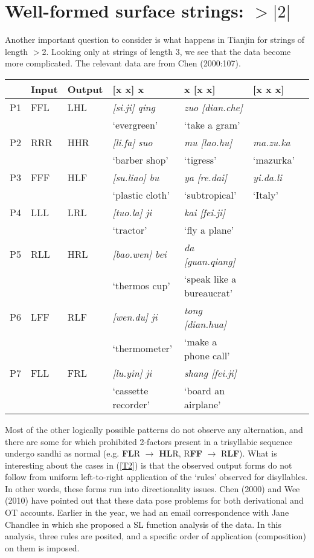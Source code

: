 \documentclass{article}
\begin{document}
\section{Well-formed surface strings: $>|2|$}
Another important question to consider is what happens in Tianjin for strings of length $>$2. Looking only at strings of length 3, we see that the data become more complicated. The relevant data are from Chen (2000:107).
\begin{exe}
\ex \label{T2}
\renewcommand{\arraystretch}{1.2}
\begin{tabular}[t]{lllllll}
& Input & Output & [x x] x & x [x x] & [x x x] \\
\hline 
P1 & FFL & LHL & \textit{[si.ji] qing} & \textit{zuo [dian.che]} & \\
&&& `evergreen' & `take a gram' & \\
P2 & RRR & HHR & \emph{[li.fa] suo} & \emph{mu [lao.hu]} & \emph{ma.zu.ka}\\
&&& `barber shop' & `tigress' & `mazurka' \\
P3 & FFF & HLF & \emph{[su.liao] bu} & \emph{ya [re.dai]} & \emph{yi.da.li}\\
&&& `plastic cloth' & `subtropical' & `Italy' \\
P4 & LLL & LRL & \emph{[tuo.la] ji} & \emph{kai [fei.ji]} & \\
&&& `tractor' & `fly a plane' & \\
P5 & RLL & HRL & \emph{[bao.wen] bei} & \emph{da [guan.qiang]} & \\
&&& `thermos cup' & `speak like a bureaucrat' & \\
P6 & LFF & RLF & \emph{[wen.du] ji} & \emph{tong [dian.hua]} & \\
&&& `thermometer' & `make a phone call' & \\
P7 & FLL & FRL & \emph{[lu.yin] ji} & \emph{shang [fei.ji]} & \\
&&& `cassette recorder' & `board an airplane' & \\
\hline
\end{tabular}
\end{exe}
Most of the other logically possible patterns do not observe any alternation, and there are some for which prohibited 2-factors present in a trisyllabic sequence undergo sandhi as normal (e.g. \textbf{FL}R $\rightarrow$ \textbf{HL}R, R\textbf{FF} $\rightarrow$ R\textbf{LF}). What is interesting about the cases in (\ref{T2}) is that the observed output forms do not follow from uniform left-to-right application of the `rules' observed for disyllables. In other words, these forms run into directionality issues. Chen (2000) and Wee (2010) have pointed out that these data pose problems for both derivational and OT accounts. Earlier in the year, we had an email correspondence with Jane Chandlee in which she proposed a SL function analysis of the data. In this analysis, three rules are posited, and a specific order of application (composition) on them is imposed.
\end{document}
